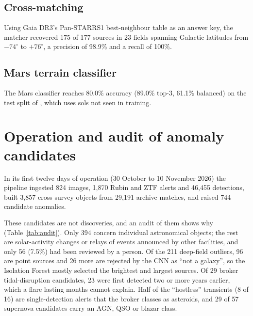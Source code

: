 \documentclass[preprint,11pt,authoryear]{elsarticle}
\begin{document}
\subsection{Cross-matching}

Using Gaia DR3's Pan-STARRS1 best-neighbour table as an answer key, the matcher
recovered 175 of 177 sources in 23 fields spanning Galactic latitudes from
$-74^\circ$ to $+76^\circ$, a precision of 98.9\% and a recall of 100\%.

\subsection{Mars terrain classifier}

The Mars classifier reaches 80.0\% accuracy (89.0\% top-3, 61.1\% balanced) on
the test split of \citet{Lu2020}, which uses sols not seen in training.

\section{Operation and audit of anomaly candidates}
\label{sec:audit}

In its first twelve days of operation (30 October to 10 November 2026) the
pipeline ingested 824 images, 1,870 Rubin and ZTF alerts and 46,455 detections,
built 3,857 cross-survey objects from 29,191 archive matches, and raised 744
candidate anomalies.

These candidates are not discoveries, and an audit of them shows why
(Table~\ref{tab:audit}). Only 394 concern individual astronomical objects; the
rest are solar-activity changes or relays of events announced by other
facilities, and only 56 (7.5\%) had been reviewed by a person. Of the 211
deep-field outliers, 96 are point sources and 26 more are rejected by the CNN as
``not a galaxy'', so the Isolation Forest mostly selected the brightest and
largest sources. Of 29 broker tidal-disruption candidates, 23 were first
detected two or more years earlier, which a flare lasting months cannot explain.
Half of the ``hostless'' transients (8 of 16) are single-detection alerts that
the broker classes as asteroids, and 29 of 57 supernova candidates carry an AGN,
QSO or blazar class.
\end{document}
